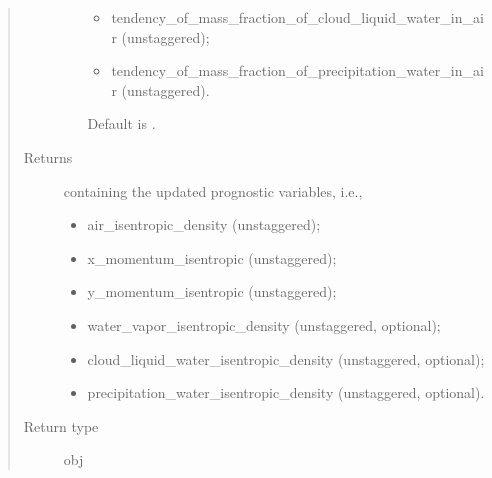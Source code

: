 \documentclass[letterpaper,10pt,english]{sphinxmanual}
\begin{document}
\begin{fulllineitems}
\begin{fulllineitems}
\begin{quote}
\begin{description}
\begin{itemize}
\begin{itemize}
\item {} 
tendency\_of\_mass\_fraction\_of\_cloud\_liquid\_water\_in\_air (unstaggered);

\item {} 
tendency\_of\_mass\_fraction\_of\_precipitation\_water\_in\_air (unstaggered).

\end{itemize}

Default is .


\end{itemize}

\item[{Returns}] \leavevmode

{\hyperref[\detokenize{api:tasmania.storages.state_isentropic.StateIsentropic}]{}} containing the updated prognostic variables, i.e.,
\begin{itemize}
\item {} 
air\_isentropic\_density (unstaggered);

\item {} 
x\_momentum\_isentropic (unstaggered);

\item {} 
y\_momentum\_isentropic (unstaggered);

\item {} 
water\_vapor\_isentropic\_density (unstaggered, optional);

\item {} 
cloud\_liquid\_water\_isentropic\_density (unstaggered, optional);

\item {} 
precipitation\_water\_isentropic\_density (unstaggered, optional).

\end{itemize}


\item[{Return type}] \leavevmode
obj

\end{description}\end{quote}

\end{fulllineitems}


\end{fulllineitems}

\end{document}
